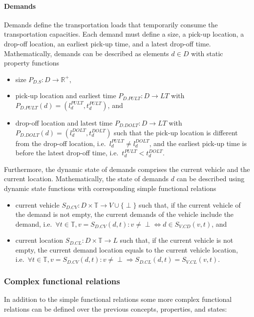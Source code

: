 \documentclass{article}
\begin{document}
    \paragraph{Demands}
    Demands define the transportation loads that temporarily consume the transportation capacities.
    Each demand must define a size, a pick-up location, a drop-off location, an earliest pick-up time, and a latest drop-off time.
    Mathematically, demands can be described as elements $d \in D$ with static property functions
    \begin{itemize}
        \item size $P_{D.S}: D \rightarrow \mathbb{R}^+$,
        \item pick-up location and earliest time $P_{D.PULT}: D \rightarrow LT$ with $P_{D.PULT}(d) = (l_d^{PULT},t_d^{PULT})$, and
        \item drop-off location and latest time $P_{D.DOLT}: D \rightarrow LT$ with $P_{D.DOLT}(d) = (l_d^{DOLT},t_d^{DOLT})$ such that the pick-up location is different from the drop-off location, i.e.\ $l_d^{PULT} \neq l_d^{DOLT}$, and the earliest pick-up time is before the latest drop-off time, i.e.\ $t_d^{PULT} < t_d^{DOLT}$.
    \end{itemize}
    Furthermore, the dynamic state of demands comprises the current vehicle and the current location.
    Mathematically, the state of demands $d$ can be described using dynamic state functions with corresponding simple functional relations
    \begin{itemize}
        \item current vehicle $S_{D.CV}: D \times \mathbb{T} \rightarrow V \cup \{\perp\}$ such that, if the current vehicle of the demand is not empty, the current demands of the vehicle include the demand, i.e.\ $\forall t \in \mathbb{T}, v = S_{D.CV}(d,t): v \neq \perp \Leftrightarrow d \in S_{V.CD}(v,t)$, and
        \item current location $S_{D.CL}: D \times \mathbb{T} \rightarrow L$ such that, if the current vehicle is not empty, the current demand location equals to the current vehicle location, i.e.\ $\forall t \in \mathbb{T}, v = S_{D.CV}(d,t): v \neq \perp \Rightarrow S_{D.CL}(d,t)=S_{V.CL}(v,t)$.
    \end{itemize}

    \subsubsection{Complex functional relations}
    In addition to the simple functional relations some more complex functional relations can be defined over the previous concepts, properties, and states:
\end{document}
